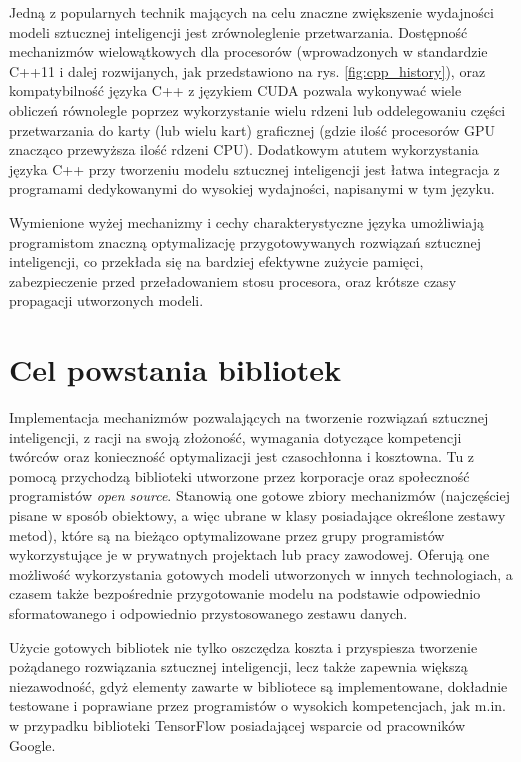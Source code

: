 Jedną z popularnych technik mających na celu znaczne zwiększenie wydajności modeli sztucznej inteligencji jest zrównoleglenie przetwarzania. Dostępność mechanizmów wielowątkowych dla procesorów (wprowadzonych w standardzie C++11 i dalej rozwijanych, jak przedstawiono na rys. \ref{fig:cpp_history}), oraz kompatybilność języka C++ z językiem CUDA pozwala wykonywać wiele obliczeń równolegle poprzez wykorzystanie wielu rdzeni lub oddelegowaniu części przetwarzania do karty (lub wielu kart) graficznej (gdzie ilość procesorów GPU znacząco przewyższa ilość rdzeni CPU). Dodatkowym atutem wykorzystania języka C++ przy tworzeniu modelu sztucznej inteligencji jest łatwa integracja z programami dedykowanymi do wysokiej wydajności, napisanymi w tym języku.

Wymienione wyżej mechanizmy i cechy charakterystyczne języka umożliwiają programistom znaczną optymalizację przygotowywanych rozwiązań sztucznej inteligencji, co przekłada się na bardziej efektywne zużycie pamięci, zabezpieczenie przed przeładowaniem stosu procesora, oraz krótsze czasy propagacji utworzonych modeli.

\section{Cel powstania bibliotek}

Implementacja mechanizmów pozwalających na tworzenie rozwiązań sztucznej inteligencji, z racji na swoją złożoność, wymagania dotyczące kompetencji twórców  oraz konieczność optymalizacji jest czasochłonna i kosztowna. Tu z pomocą przychodzą biblioteki utworzone przez korporacje oraz społeczność programistów \textit{open source}. Stanowią one gotowe zbiory mechanizmów (najczęściej pisane w sposób obiektowy, a więc ubrane w klasy posiadające określone zestawy metod), które są na bieżąco optymalizowane przez grupy programistów wykorzystujące je w prywatnych projektach lub pracy zawodowej. Oferują one możliwość wykorzystania gotowych modeli utworzonych w innych technologiach, a czasem także bezpośrednie przygotowanie modelu na podstawie odpowiednio sformatowanego i odpowiednio przystosowanego zestawu danych.

Użycie gotowych bibliotek nie tylko oszczędza koszta i przyspiesza tworzenie pożądanego rozwiązania sztucznej inteligencji, lecz także zapewnia większą niezawodność, gdyż elementy zawarte w bibliotece są implementowane, dokładnie testowane i poprawiane przez programistów o wysokich kompetencjach, jak m.in. w przypadku biblioteki TensorFlow posiadającej wsparcie od pracowników Google.

